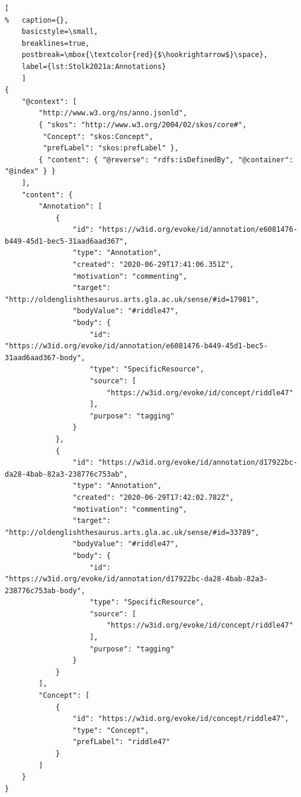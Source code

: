 \noindent
\begin{minipage}[c]{\textwidth}
	\begin{lstlisting}[
%	caption={},
    basicstyle=\small,
    breaklines=true,
    postbreak=\mbox{\textcolor{red}{$\hookrightarrow$}\space},
	label={lst:Stolk2021a:Annotations}
	]
{
	"@context": [
		"http://www.w3.org/ns/anno.jsonld",
		{ "skos": "http://www.w3.org/2004/02/skos/core#", 
         "Concept": "skos:Concept", 
         "prefLabel": "skos:prefLabel" },
		{ "content": { "@reverse": "rdfs:isDefinedBy", "@container": "@index" } }
	],
	"content": {
		"Annotation": [
			{
				"id": "https://w3id.org/evoke/id/annotation/e6081476-b449-45d1-bec5-31aad6aad367",
				"type": "Annotation",
				"created": "2020-06-29T17:41:06.351Z",
				"motivation": "commenting",
				"target": "http://oldenglishthesaurus.arts.gla.ac.uk/sense/#id=17981",
				"bodyValue": "#riddle47",
				"body": {
					"id": "https://w3id.org/evoke/id/annotation/e6081476-b449-45d1-bec5-31aad6aad367-body",
					"type": "SpecificResource",
					"source": [
						"https://w3id.org/evoke/id/concept/riddle47"
					],
					"purpose": "tagging"
				}
			},
			{
				"id": "https://w3id.org/evoke/id/annotation/d17922bc-da28-4bab-82a3-238776c753ab",
				"type": "Annotation",
				"created": "2020-06-29T17:42:02.782Z",
				"motivation": "commenting",
				"target": "http://oldenglishthesaurus.arts.gla.ac.uk/sense/#id=33789",
				"bodyValue": "#riddle47",
				"body": {
					"id": "https://w3id.org/evoke/id/annotation/d17922bc-da28-4bab-82a3-238776c753ab-body",
					"type": "SpecificResource",
					"source": [
						"https://w3id.org/evoke/id/concept/riddle47"
					],
					"purpose": "tagging"
				}
			}
		],
		"Concept": [
			{
				"id": "https://w3id.org/evoke/id/concept/riddle47",
				"type": "Concept",
				"prefLabel": "riddle47"
			}
		]
	}
}
	\end{lstlisting}
\end{minipage}
